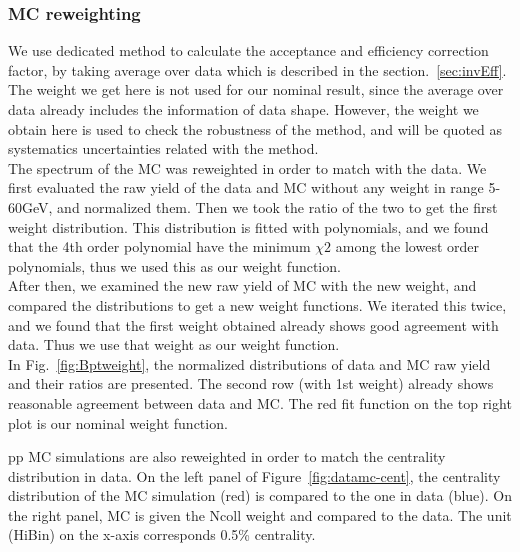\subsubsection{MC reweighting}
\label{sec:mcreweighting}
We use dedicated method to calculate the acceptance and efficiency correction factor, by taking average over data which is described in the section.~\ref{sec:invEff}. The \pt weight we get here is not used for our nominal result, since the average over data already includes the information of data \pt shape. However, the \pt weight we obtain here is used to check the robustness of the method, and will be quoted as systematics uncertainties related with the method. \\
The \pt spectrum of the \Bplus MC was reweighted in order to match with the data. We first evaluated the raw yield of the data and MC without any \pt weight in \pt range 5-60GeV, and normalized them. Then we took the ratio of the two to get the first \pt weight distribution. This distribution is fitted with polynomials, and we found that the 4th order polynomial have the minimum $\chi2$ among the lowest order polynomials, thus we used this as our weight function. \\
After then, we examined the new raw yield of MC with the new weight, and compared the distributions to get a new weight functions. We iterated this twice, and we found that the first \pt weight obtained already shows good agreement with data. Thus we use that \pt weight as our weight function. \\
In Fig.~\ref{fig:Bptweight}, the normalized distributions of data and MC raw yield and their ratios are presented. The second row (with 1st \pt weight) already shows reasonable agreement between data and MC. The red fit function on the top right plot is our nominal \pt weight function.


pp MC simulations are also reweighted in order to match the centrality distribution in data.
On the left panel of Figure~\ref{fig:datamc-cent}, the centrality distribution of the MC simulation (red) is compared to the one in data (blue). On the right panel, MC is given the Ncoll weight and compared to the data.
The unit (HiBin) on the x-axis corresponds 0.5\% centrality.


